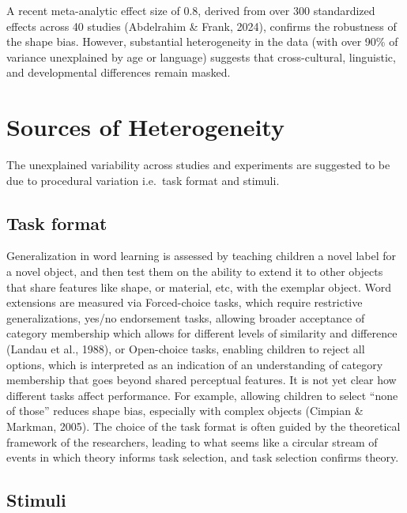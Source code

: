 \documentclass[10pt, letterpaper]{article}
\begin{document}
A recent meta-analytic effect size of 0.8, derived from over 300
standardized effects across 40 studies (Abdelrahim \& Frank, 2024),
confirms the robustness of the shape bias. However, substantial
heterogeneity in the data (with over 90\% of variance unexplained by age
or language) suggests that cross-cultural, linguistic, and developmental
differences remain masked.

\hypertarget{sources-of-heterogeneity}{%
\section{Sources of Heterogeneity}\label{sources-of-heterogeneity}}

The unexplained variability across studies and experiments are suggested
to be due to procedural variation i.e.~task format and stimuli.

\hypertarget{task-format}{%
\subsection{Task format}\label{task-format}}

Generalization in word learning is assessed by teaching children a novel
label for a novel object, and then test them on the ability to extend it
to other objects that share features like shape, or material, etc, with
the exemplar object. Word extensions are measured via Forced-choice
tasks, which require restrictive generalizations, yes/no endorsement
tasks, allowing broader acceptance of category membership which allows
for different levels of similarity and difference (Landau et al., 1988),
or Open-choice tasks, enabling children to reject all options, which is
interpreted as an indication of an understanding of category membership
that goes beyond shared perceptual features. It is not yet clear how
different tasks affect performance. For example, allowing children to
select ``none of those'' reduces shape bias, especially with complex
objects (Cimpian \& Markman, 2005). The choice of the task format is
often guided by the theoretical framework of the researchers, leading to
what seems like a circular stream of events in which theory informs task
selection, and task selection confirms theory.

\hypertarget{stimuli}{%
\subsection{Stimuli}\label{stimuli}}
\end{document}
